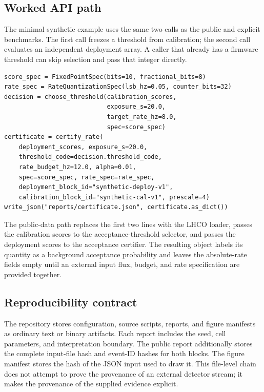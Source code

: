 \documentclass[submission, Phys]{SciPost}
\begin{document}
\subsection{Worked API path}

The minimal synthetic example uses the same two calls as the public and
explicit benchmarks.  The first call freezes a threshold from calibration; the
second call evaluates an independent deployment array.  A caller that already
has a firmware threshold can skip selection and pass that integer directly.

\begin{verbatim}
score_spec = FixedPointSpec(bits=10, fractional_bits=8)
rate_spec = RateQuantizationSpec(lsb_hz=0.05, counter_bits=32)
decision = choose_threshold(calibration_scores,
                            exposure_s=20.0,
                            target_rate_hz=8.0,
                            spec=score_spec)
certificate = certify_rate(
    deployment_scores, exposure_s=20.0,
    threshold_code=decision.threshold_code,
    rate_budget_hz=12.0, alpha=0.01,
    spec=score_spec, rate_spec=rate_spec,
    deployment_block_id="synthetic-deploy-v1",
    calibration_block_id="synthetic-cal-v1", prescale=4)
write_json("reports/certificate.json", certificate.as_dict())
\end{verbatim}

The public-data path replaces the first two lines with the LHCO loader, passes
the calibration scores to the acceptance-threshold selector, and passes the
deployment scores to the acceptance certifier.  The resulting object labels
its quantity as a background acceptance probability and leaves the absolute-rate
fields empty until an external input flux, budget, and rate specification are
provided together.

\subsection{Reproducibility contract}

The repository stores configuration, source scripts, reports, and figure
manifests as ordinary text or binary artifacts.  Each report includes the seed,
cell parameters, and interpretation boundary.  The public report additionally
stores the complete input-file hash and event-ID hashes for both blocks.  The
figure manifest stores the hash of the JSON input used to draw it.  This
file-level chain does not attempt to prove the provenance of an external
detector stream; it makes the provenance of the supplied evidence explicit.
\end{document}
